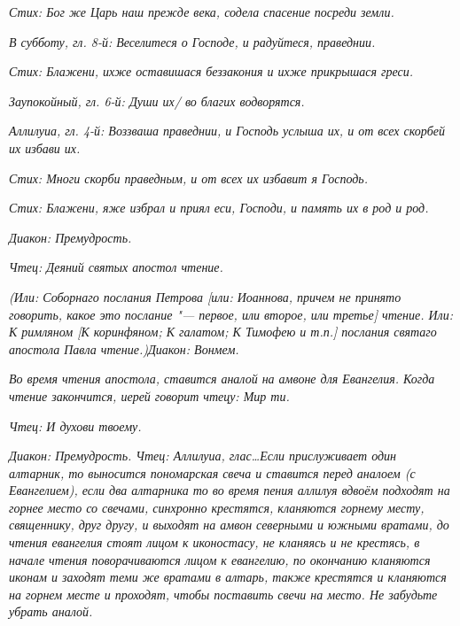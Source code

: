 \itshape Стих:\normalfont{} Бог же Царь наш прежде века, содела спасение посреди земли. 


\itshape В субботу, гл. 8-й:\normalfont{} Веселитеся о Господе, и радуйтеся, праведнии.


\itshape  Стих:\normalfont{} Блажени, ихже оставишася беззакония и ихже прикрышася греси.


\itshape  Заупокойный, гл. 6-й:\normalfont{} Души их/ во благих водворятся.


\itshape  Аллилуиа, гл. 4-й:\normalfont{} Воззваша праведнии, и Господь услыша их, и от всех скорбей их избави их.


\itshape  Стих:\normalfont{} Многи скорби праведным, и от всех их избавит я Господь.


\itshape  Стих:\normalfont{} Блажени, яже избрал и приял еси, Господи, и память их в род и род.


\itshape Диакон:\normalfont{} Премудрость.


\itshape  Чтец:\normalfont{} Деяний святых апостол чтение.


\itshape (Или:\normalfont{} Соборнаго послания Петрова \itshape [или:\normalfont{} Иоаннова\itshape , причем не принято говорить, какое это послание "--- первое, или второе, или третье\normalfont{}] чтение\itshape . Или:\normalfont{} К римляном [К коринфяном; К галатом; К Тимофе\itshape ю и т.п.\normalfont{}] послания святаго апостола Павла чтение.)\itshape  Диакон:\normalfont{} Вонмем.



\itshape Во время чтения апостола, ставится аналой на амвоне для Евангелия. Когда чтение закончится, иерей говорит чтецу:\normalfont{} Мир ти.


\itshape  Чтец:\normalfont{} И духови твоему.




\itshape Диакон:\normalfont{} Премудрость.
\itshape Чтец:\normalfont{} Аллилуиа, глас…\itshape  Если прислуживает один алтарник, то выносится пономарская свеча и ставится перед аналоем (с Евангелием), если два алтарника то во время пения аллилуя вдвоём подходят на горнее место со свечами, синхронно крестятся, кланяются горнему месту, священнику, друг другу, и выходят на амвон северными и южными вратами, до чтения евангелия стоят лицом к иконостасу, не кланяясь и не крестясь, в начале чтения поворачиваются лицом к евангелию, по окончанию кланяются иконам и заходят теми же вратами в алтарь, также крестятся и кланяются на горнем месте и проходят, чтобы поставить свечи на место. Не забудьте убрать аналой.\normalfont{}


